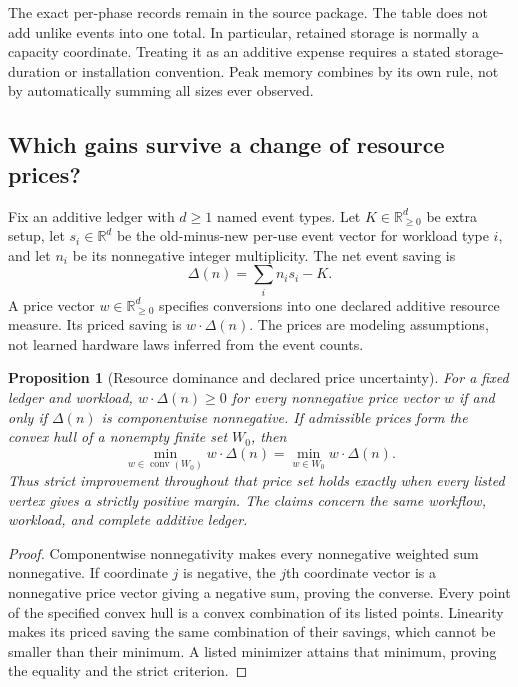 \documentclass[11pt,letterpaper]{article}
\theoremstyle{plain}
\newtheorem{proposition}[theorem]{Proposition}
\theoremstyle{definition}
\begin{document}
The exact per-phase records remain in the source package. The table does not add unlike events into one total. In particular, retained storage is normally a capacity coordinate. Treating it as an additive expense requires a stated storage-duration or installation convention. Peak memory combines by its own rule, not by automatically summing all sizes ever observed.

\subsection{Which gains survive a change of resource prices?}
Fix an additive ledger with $d\ge1$ named event types. Let $K\in\mathbb R_{\ge0}^d$ be extra setup, let $s_i\in\mathbb R^d$ be the old-minus-new per-use event vector for workload type $i$, and let $n_i$ be its nonnegative integer multiplicity. The net event saving is
\begin{equation}\label{eq:vector-saving}
 \Delta(n)=\sum_i n_i s_i-K.
\end{equation}
A price vector $w\in\mathbb R_{\ge0}^d$ specifies conversions into one declared additive resource measure. Its priced saving is $w\cdot\Delta(n)$. The prices are modeling assumptions, not learned hardware laws inferred from the event counts.

\begin{proposition}[Resource dominance and declared price uncertainty]\label{prop:resource-prices}
For a fixed ledger and workload, $w\cdot\Delta(n)\ge0$ for every nonnegative price vector $w$ if and only if $\Delta(n)$ is componentwise nonnegative. If admissible prices form the convex hull of a nonempty finite set $W_0$, then
\[
 \min_{w\in\operatorname{conv}(W_0)}w\cdot\Delta(n)
 =\min_{w\in W_0}w\cdot\Delta(n).
\]
Thus strict improvement throughout that price set holds exactly when every listed vertex gives a strictly positive margin. The claims concern the same workflow, workload, and complete additive ledger.
\end{proposition}
\begin{proof}
Componentwise nonnegativity makes every nonnegative weighted sum nonnegative. If coordinate $j$ is negative, the $j$th coordinate vector is a nonnegative price vector giving a negative sum, proving the converse. Every point of the specified convex hull is a convex combination of its listed points. Linearity makes its priced saving the same combination of their savings, which cannot be smaller than their minimum. A listed minimizer attains that minimum, proving the equality and the strict criterion.
\end{proof}
\end{document}
